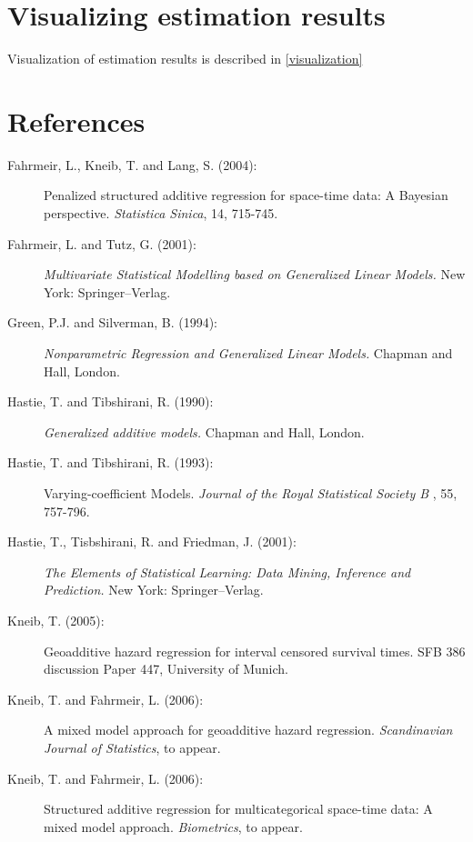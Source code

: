 \section{Visualizing estimation results}

Visualization of estimation results is described in
\autoref{visualization}

\section{References}
\label{remlregreferences}

\begin{description}

\item[Fahrmeir, L., Kneib, T. and Lang, S. (2004):] Penalized
structured additive regression for space-time data: A Bayesian
perspective. {\it Statistica Sinica}, 14, 715-745.

\item[Fahrmeir, L. and Tutz, G. (2001):] {\em Multivariate
Statistical Modelling based on Generalized Linear Models.} New
York: Springer--Verlag.

\item[Green, P.J. and Silverman, B. (1994):] {\em Nonparametric Regression and Generalized Linear Models.} Chapman
and Hall, London.

\item[Hastie, T. and Tibshirani, R. (1990):] {\em Generalized additive models.} Chapman and
Hall, London.

\item[Hastie, T. and Tibshirani, R. (1993):] Varying-coefficient Models.
{\em Journal of the Royal Statistical Society B} , 55, 757-796.

\item[Hastie, T., Tisbshirani, R. and Friedman, J. (2001):] {\em The Elements of Statistical Learning: Data Mining,
Inference and Prediction.} New York: Springer--Verlag.

\item[Kneib, T. (2005):] Geoadditive hazard regression for interval censored survival times. SFB 386 discussion Paper 447,
University of Munich.

\item[Kneib, T. and Fahrmeir, L. (2006):] A mixed model approach
for geoadditive hazard regression. {\em Scandinavian Journal of
Statistics}, to appear.

\item[Kneib, T. and Fahrmeir, L. (2006):] Structured additive
regression for multicategorical space-time data: A mixed model
approach. {\it Biometrics}, to appear.


\end{description}
